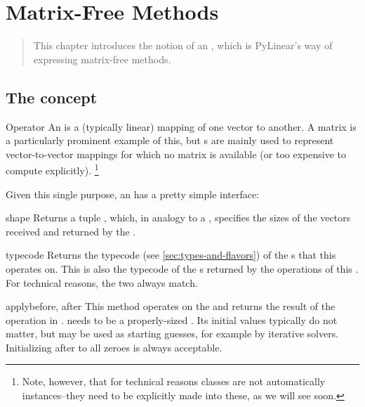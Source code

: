 \chapter{Matrix-Free Methods}
\label{cha:matrixfree}

\begin{quote}
   This chapter introduces the notion of an , which
   is PyLinear's way of expressing matrix-free methods.
\end{quote}

\section{The  concept}

\begin{classdesc*}{Operator}
  An  is a (typically linear) mapping
  of one vector to another. A matrix is a particularly prominent
  example of this, but s are mainly used to represent
  vector-to-vector mappings for which no matrix is available (or too
  expensive to compute explicitly).
  \footnote{
    Note, however, that for technical reasons  classes are
    not automatically  instances--they need to be
    explicitly made into these, as we will see soon.
  }
\end{classdesc*}

Given this single purpose, an  has a pretty 
simple interface:
\begin{memberdesc}[Operator]{shape}
  Returns a tuple , which, in analogy to a ,
  specifies the sizes of the vectors received and returned by the
  .
\end{memberdesc}
\begin{methoddesc}[Operator]{typecode}{}
  Returns the typecode (see \ref{sec:types-and-flavors}) of the
  s that this  operates on. This is also
  the typecode of the s returned by the operations of this
  . For technical reasons, the two always match.
\end{methoddesc}
\begin{methoddesc}[Operator]{apply}{before, after}
  This method operates on the   and returns
  the result of the operation in . 
  needs to be a properly-sized . Its initial values
  typically do not matter, but may be used as starting guesses,
  for example by iterative solvers. Initializing after to
  all zeroes is always acceptable.
\end{methoddesc}

